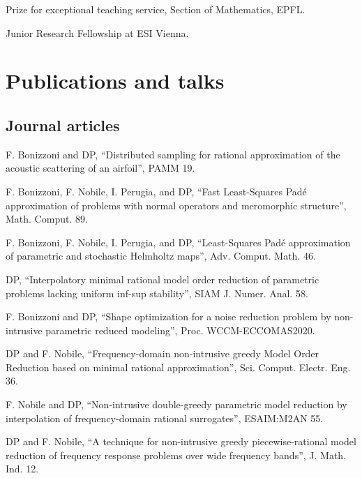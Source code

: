 \documentclass[11pt]{article} %
\begin{document}
Prize for exceptional teaching service, Section of Mathematics, EPFL.

Junior Research Fellowship at ESI Vienna.


\section*{Publications and talks}

\subsection*{Journal articles}

\hspace{\parindent}F. Bonizzoni and DP, ``Distributed sampling for rational approximation of the acoustic scattering of an airfoil'', PAMM 19.

F. Bonizzoni, F. Nobile, I. Perugia, and DP, ``Fast Least-Squares Pad\'e approximation of problems with normal operators and meromorphic structure'', Math. Comput. 89.

F. Bonizzoni, F. Nobile, I. Perugia, and DP, ``Least-Squares Pad\'e approximation of parametric and stochastic Helmholtz maps'', Adv. Comput. Math. 46.

\yearsminus DP, ``Interpolatory minimal rational model order reduction of parametric problems lacking uniform inf-sup stability'', SIAM J. Numer. Anal. 58.

F. Bonizzoni and DP, ``Shape optimization for a noise reduction problem by non-intrusive parametric reduced modeling'', Proc. WCCM-ECCOMAS2020.

DP and F. Nobile, ``Frequency-domain non-intrusive greedy Model Order Reduction based on minimal rational approximation'', Sci. Comput. Electr. Eng. 36.

\yearsminus F. Nobile and DP, ``Non-intrusive double-greedy parametric model reduction by interpolation of frequency-domain rational surrogates'', ESAIM:M2AN 55.

DP and F. Nobile, ``A technique for non-intrusive greedy piecewise-rational model reduction of frequency response problems over wide frequency bands'', J. Math. Ind. 12.
\end{document}
